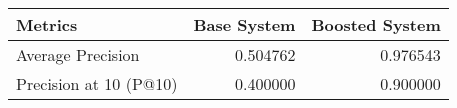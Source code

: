 \begin{tabular}{lrr}
\toprule
Metrics & Base System & Boosted System \\
\midrule
Average Precision & 0.504762 & 0.976543 \\
Precision at 10 (P@10) & 0.400000 & 0.900000 \\
\bottomrule
\end{tabular}
